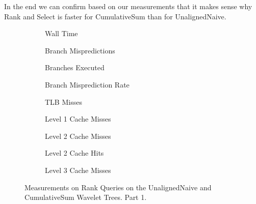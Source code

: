In the end we can confirm based on our measurements that it makes sense why Rank and Select is faster for CumulativeSum than for UnalignedNaive.








\begin{figure}\tiny

\begin{subfigure}{0.30\textwidth}
	
	\caption{Wall Time}
	\label{fig:CumulativeSumRankWalltime}
\end{subfigure}
\hfill
\begin{subfigure}{0.30\textwidth}
	
	\caption{Branch Mispredictions}
	\label{fig:CumulativeSumRankBranchMiss}
\end{subfigure}
\hfill
\begin{subfigure}{0.30\textwidth}
	
	\caption{Branches Executed}
	\label{fig:CumulativeSumRankBranchExe}
\end{subfigure}


\begin{subfigure}{0.30\textwidth}
	
	\caption{Branch Misprediction Rate}
	\label{fig:CumulativeSumRankBranchMissRate}
\end{subfigure}
\hfill
\begin{subfigure}{0.30\textwidth}
	
	\caption{TLB Misses}
	\label{fig:CumulativeSumRankTLBMiss}
\end{subfigure}
\hfill
\begin{subfigure}{0.30\textwidth}
	
	\caption{Level 1 Cache Misses}
	\label{fig:CumulativeSumRankL1CM}
\end{subfigure}

\begin{subfigure}{0.30\textwidth}
	
	\caption{Level 2 Cache Misses}
	\label{fig:CumulativeSumRankL2CM}
\end{subfigure}
\hfill
\begin{subfigure}{0.30\textwidth}
	
\caption{Level 2 Cache Hits}
\label{fig:CumulativeSumRankL2CHits}
\end{subfigure}
\hfill
%	
\begin{subfigure}{0.30\textwidth}
	
	\caption{Level 3 Cache Misses}
	\label{fig:CumulativeSumRankL3CM}
\end{subfigure}

\caption{Measurements on Rank Queries on the UnalignedNaive and CumulativeSum Wavelet Trees. Part 1.}
\label{fig:CumulativeSumRank}
\end{figure}





